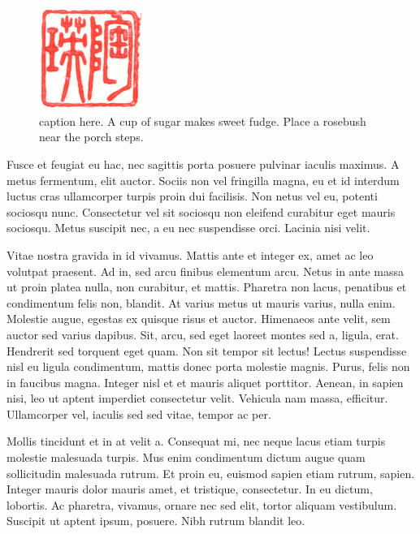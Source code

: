 \documentclass[
  9pt,
  letterpaper,
  DIV=11,
  numbers=noendperiod]{scrartcl}
\begin{document}
\begin{figure}
  \centering
  \includegraphics[width=0.3\textwidth,height=0.3\textwidth]{stamp1a.jpg}
  \caption{\label{fig-wrap2}caption here. A cup of sugar makes sweet fudge. Place a rosebush near the porch steps.}
  \vspace{-6pt}
\end{figure}

Fusce et feugiat eu hac, nec sagittis porta posuere pulvinar iaculis
maximus. A metus fermentum, elit auctor. Sociis non vel fringilla magna,
eu et id interdum luctus cras ullamcorper turpis proin dui facilisis.
Non netus vel eu, potenti sociosqu nunc. Consectetur vel sit sociosqu
non eleifend curabitur eget mauris sociosqu. Metus suscipit nec, a eu
nec suspendisse orci. Lacinia nisi velit.

Vitae nostra gravida in id vivamus. Mattis ante et integer ex, amet ac
leo volutpat praesent. Ad in, sed arcu finibus elementum arcu. Netus in
ante massa ut proin platea nulla, non curabitur, et mattis. Pharetra non
lacus, penatibus et condimentum felis non, blandit. At varius metus ut
mauris varius, nulla enim. Molestie augue, egestas ex quisque risus et
auctor. Himenaeos ante velit, sem auctor sed varius dapibus. Sit, arcu,
sed eget laoreet montes sed a, ligula, erat. Hendrerit sed torquent eget
quam. Non sit tempor sit lectus! Lectus suspendisse nisl eu ligula
condimentum, mattis donec porta molestie magnis. Purus, felis non in
faucibus magna. Integer nisl et et mauris aliquet porttitor. Aenean, in
sapien nisi, leo ut aptent imperdiet consectetur velit. Vehicula nam
massa, efficitur. Ullamcorper vel, iaculis sed sed vitae, tempor ac per.

Mollis tincidunt et in at velit a. Consequat mi, nec neque lacus etiam
turpis molestie malesuada turpis. Mus enim condimentum dictum augue quam
sollicitudin malesuada rutrum. Et proin eu, euismod sapien etiam rutrum,
sapien. Integer mauris dolor mauris amet, et tristique, consectetur. In
eu dictum, lobortis. Ac pharetra, vivamus, ornare nec sed elit, tortor
aliquam vestibulum. Suscipit ut aptent ipsum, posuere. Nibh rutrum
blandit leo.
\end{document}

